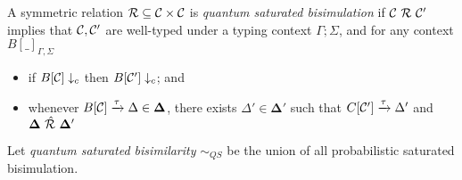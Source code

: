 \begin{definition}
	A symmetric relation $\mathcal{R} \subseteq \mathcal{C} \times \mathcal{C}$ is \emph{quantum saturated bisimulation} if $\mathcal{C}\ \mathcal{R}\ \mathcal{C}'$ implies that $\mathcal{C}, \mathcal{C}'$ are well-typed under a typing context $\Gamma; \Sigma$, and for any context $B[\_]_{\Gamma, \Sigma}$
	\begin{itemize}
		\item if $B[\mathcal{C}] \downarrow_{c}$ then $B[\mathcal{C}'] \downarrow_{c}$; and 
		\item whenever $B[\mathcal{C}] \xrightarrow{\tau} \Delta \in \mathbf{\Delta}$, there exists $\Delta' \in \mathbf{\Delta'}$ such that $C[\mathcal{C}'] \xrightarrow{\tau} \Delta'$ and $\mathbf{\Delta}\ \sqlift{\rel}\ \mathbf{\Delta'}$
	\end{itemize}
	Let \emph{quantum saturated bisimilarity} $\sim_{QS}$ be the union of all probabilistic saturated bisimulation.
\end{definition}


